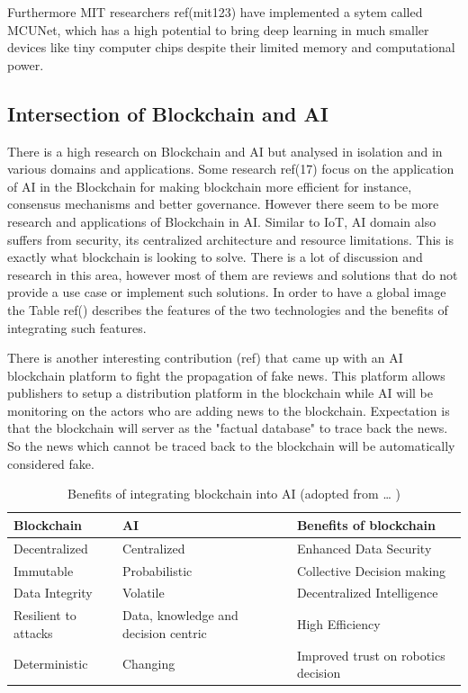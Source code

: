 Furthermore MIT researchers ref(mit123) have implemented a sytem called MCUNet, which has a high potential to bring deep learning in much smaller devices like tiny computer chips despite their limited memory and computational power. 

\subsection{Intersection of Blockchain and AI}

There is a high research on Blockchain and AI but analysed in isolation and in various domains and applications. Some research ref(17) focus on the application of AI in the Blockchain for making blockchain more efficient for instance, consensus mechanisms and better governance. However there seem to be more research and applications of Blockchain in AI. Similar to IoT, AI domain also suffers from security, its centralized architecture and resource limitations. This is exactly what blockchain is looking to solve. There is a lot of discussion and research in this area, however most of them are reviews and solutions that do not provide a use case or implement such solutions. In order to have a global image the Table ref() describes the features of the two technologies and the benefits of integrating such features.

There is another interesting contribution (ref) that came up with an AI blockchain platform to fight the propagation of fake news. This platform allows publishers to setup a distribution platform in the blockchain while AI will be monitoring on the actors who are adding news to the blockchain. Expectation is that the blockchain will server as the "factual database" to trace back the news. So the news which cannot be traced back to the blockchain will be automatically considered fake. 




\begin{table}[hbt!]

    
    \begin{tabular}{  p{4.4cm}  p{4.4cm}  p{5.4cm} }
      
\textbf{Blockchain}      
& \textbf{AI}   
& \textbf{Benefits of blockchain} \\\midrule
Decentralized & Centralized        
& Enhanced Data Security \\\hline

Immutable & Probabilistic       
& Collective Decision making \\\hline


Data Integrity & Volatile      
& Decentralized Intelligence \\\hline

Resilient to attacks & Data, knowledge and decision centric     
& High Efficiency \\\hline

Deterministic  &
Changing      
& Improved trust on robotics decision \\
        \bottomrule
    \end{tabular}
    \caption{Benefits of integrating blockchain into AI  (adopted from \ldots%
    )}
    \label{crouch}
\end{table}


